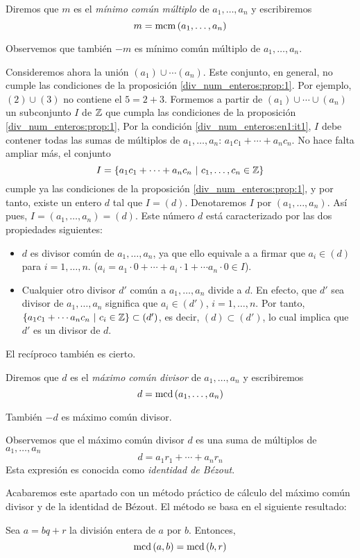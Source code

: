 Diremos que $m$ es el {\it mínimo común múltiplo} de $a_1,\dots,a_n$ y escribiremos
$$m=\operatorname{\rm mcm}\left(a_1,\dots,a_n\right)$$

Observemos que también $-m$ es mínimo común múltiplo de $a_1,\dots,a_n$.

Consideremos ahora la unión $(a_1)\cup\cdots(a_n)$. Este conjunto, en general, no cumple las condiciones de la proposición \ref{div_num_enteros:prop:1}. Por ejemplo, $(2)\cup (3)$ no contiene el $5=2+3$. Formemos a partir de $(a_1)\cup\cdots\cup (a_n)$ un subconjunto $I$ de $\mathbb{Z}$ que cumpla las condiciones de la proposición \ref{div_num_enteros:prop:1}, Por la condición \ref{div_num_enteros:en1:it1}, $I$ debe contener todas las sumas de múltiplos de $a_1,\dots,a_n$: $a_1c_1+\cdots+a_nc_n$. No hace falta ampliar más, el conjunto
$$I=\set{a_1c_1 + \cdots + a_nc_n \ | \ c_1,\dots,c_n\in\ZZ }$$
cumple ya las condiciones de la proposición \ref{div_num_enteros:prop:1}, y por tanto, existe un entero $d$ tal que $I=(d)$. Denotaremos $I$ por $(a_1,\dots,a_n)$. Así pues, $I=(a_1,\dots,a_n)=(d)$. Este número $d$ está caracterizado por las dos propiedades siguientes:
\begin{itemize}
    \item $d$ es divisor común de $a_1,\dots,a_n$, ya que ello equivale a a firmar que $a_i\in (d)$ para $i=1,\dots,n$. ($a_i=a_1\cdot 0 + \cdots + a_i\cdot 1 + \cdots a_n\cdot 0 \in I$).
    \item Cualquier otro divisor $d'$ común a $a_1,\dots,a_n$ divide a $d$. En efecto, que $d'$ sea divisor de $a_1,\dots,a_n$ significa que $a_i\in (d')$, $i=1,\dots,n$. Por tanto, $\set{a_1c_1+\cdots a_nc_n \ | \ c_i\in\ZZ}\subset (d')$, es decir, $(d)\subset (d')$, lo cual implica que $d'$ es un divisor de $d$.
\end{itemize}
El recíproco también es cierto.

Diremos que $d$ es el {\it máximo común divisor} de $a_1,\dots,a_n$ y escribiremos
$$d=\operatorname{\rm mcd}\left(a_1,\dots,a_n\right)$$

También $-d$ es máximo común divisor.

Observemos que el máximo común divisor $d$ es una suma de múltiplos de $a_1,\dots,a_n$
$$d=a_1r_1+\cdots+a_nr_n$$
Esta expresión es conocida como {\it identidad de Bézout}.

Acabaremos este apartado con un método práctico de cálculo del máximo común divisor y de la identidad de Bézout. El método se basa en el siguiente resultado:

\begin{prop}
    Sea $a=bq+r$ la división entera de $a$ por $b$. Entonces,
    $$\operatorname{\rm mcd}\left(a,b\right)=\operatorname{\rm mcd}\left(b,r\right)$$
\end{prop}

